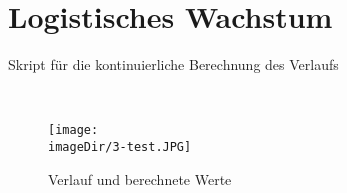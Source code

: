 \section{Logistisches Wachstum}
\begin{code}
	\caption{Skript für die kontinuierliche Berechnung des Verlaufs}
	\label{source:3-script}
\end{code}
\ \newpage
\begin{figure}[h]
	\centering
	\texttt{[image: \\imageDir/3-test.JPG]}
	\caption{Verlauf und berechnete Werte}
	\label{fig:3-test}
\end{figure}